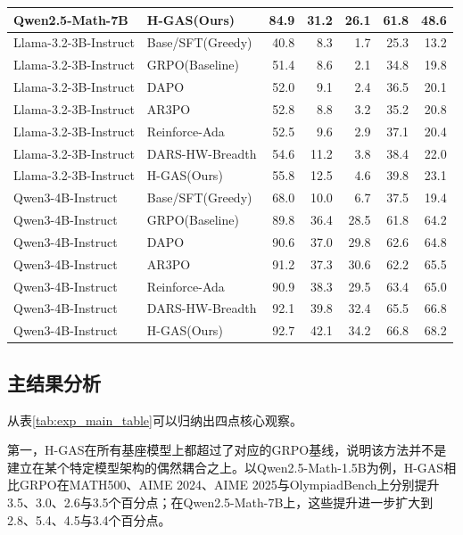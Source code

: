 \begin{table}[htbp]
{\begin{tabular}{|l|l|r|r|r|r|r|}
    Qwen2.5-Math-7B       & H-GAS(Ours)      & 84.9 & 31.2 & 26.1 & 61.8 & 48.6 \\
    \hline
    Llama-3.2-3B-Instruct & Base/SFT(Greedy) & 40.8 & 8.3  & 1.7  & 25.3 & 13.2 \\
    Llama-3.2-3B-Instruct & GRPO(Baseline)   & 51.4 & 8.6  & 2.1  & 34.8 & 19.8 \\
    Llama-3.2-3B-Instruct & DAPO             & 52.0 & 9.1  & 2.4  & 36.5 & 20.1 \\
    Llama-3.2-3B-Instruct & AR3PO            & 52.8 & 8.8  & 3.2  & 35.2 & 20.8 \\
    Llama-3.2-3B-Instruct & Reinforce-Ada    & 52.5 & 9.6  & 2.9  & 37.1 & 20.4 \\
    Llama-3.2-3B-Instruct & DARS-HW-Breadth  & 54.6 & 11.2 & 3.8  & 38.4 & 22.0 \\
    Llama-3.2-3B-Instruct & H-GAS(Ours)      & 55.8 & 12.5 & 4.6  & 39.8 & 23.1 \\
    \hline
    Qwen3-4B-Instruct     & Base/SFT(Greedy) & 68.0 & 10.0 & 6.7  & 37.5 & 19.4 \\
    Qwen3-4B-Instruct     & GRPO(Baseline)   & 89.8 & 36.4 & 28.5 & 61.8 & 64.2 \\
    Qwen3-4B-Instruct     & DAPO             & 90.6 & 37.0 & 29.8 & 62.6 & 64.8 \\
    Qwen3-4B-Instruct     & AR3PO            & 91.2 & 37.3 & 30.6 & 62.2 & 65.5 \\
    Qwen3-4B-Instruct     & Reinforce-Ada    & 90.9 & 38.3 & 29.5 & 63.4 & 65.0 \\
    Qwen3-4B-Instruct     & DARS-HW-Breadth  & 92.1 & 39.8 & 32.4 & 65.5 & 66.8 \\
    Qwen3-4B-Instruct     & H-GAS(Ours)      & 92.7 & 42.1 & 34.2 & 66.8 & 68.2 \\
    \hline
    \end{tabular}%
    }
\end{table}

\subsection{主结果分析}
\label{subsec:exp_main_analysis}

从表\ref{tab:exp_main_table}可以归纳出四点核心观察。

第一，H-GAS在所有基座模型上都超过了对应的GRPO基线，说明该方法并不是建立在某个特定模型架构的偶然耦合之上。以Qwen2.5-Math-1.5B为例，H-GAS相比GRPO在MATH500、AIME 2024、AIME 2025与OlympiadBench上分别提升3.5、3.0、2.6与3.5个百分点；在Qwen2.5-Math-7B上，这些提升进一步扩大到2.8、5.4、4.5与3.4个百分点。

